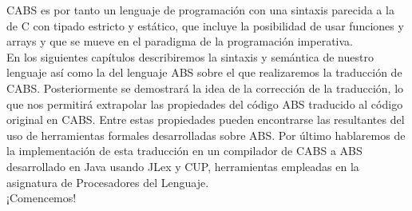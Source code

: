 CABS es por tanto un lenguaje de programación con una sintaxis parecida a la de C con tipado estricto y estático, que incluye la posibilidad de usar funciones y arrays y que se mueve en el paradigma de la programación imperativa.\\

En los siguientes capítulos describiremos la sintaxis y semántica de nuestro lenguaje así como la del lenguaje ABS sobre el que realizaremos la traducción de CABS. Posteriormente se demostrará la idea de la corrección de la traducción, lo que nos permitirá extrapolar las propiedades del código ABS traducido al código original en CABS. Entre estas propiedades pueden encontrarse las resultantes del uso de herramientas formales desarrolladas sobre ABS. Por último hablaremos de la implementación de esta traducción en un compilador de CABS a ABS desarrollado en Java usando JLex y CUP, herramientas empleadas en la asignatura de Procesadores del Lenguaje.\\

¡Comencemos!
